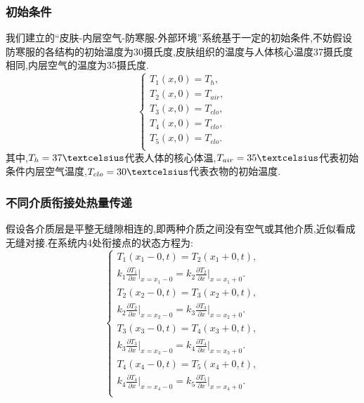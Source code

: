 \documentclass{whutmod}
\begin{document}
\subsubsection{初始条件}
我们建立的“皮肤-内层空气-防寒服-外部环境”系统基于一定的初始条件,不妨假设防寒服的各结构的初始温度为30摄氏度,皮肤组织的温度与人体核心温度37摄氏度相同,内层空气的温度为35摄氏度.
\begin{equation}
\begin{cases}
T_{1}(x,0)=T_{h},\\
T_{2}(x,0)=T_{air},\\
T_{3}(x,0)=T_{clo},\\
T_{4}(x,0)=T_{clo},\\
T_{5}(x,0)=T_{clo}.\\
\end{cases}
\end{equation}
其中,$T_{h}=37\textcelsius$代表人体的核心体温,$T_{air}=35\textcelsius$代表初始条件内层空气温度,$T_{clo}=30\textcelsius$代表衣物的初始温度.

\subsubsection{不同介质衔接处热量传递}
假设各介质层是平整无缝隙相连的,即两种介质之间没有空气或其他介质,近似看成无缝对接.在系统内4处衔接点的状态方程为:
\begin{equation}
\begin{cases} 
T_{1}(x_{1}-0,t)=T_{2}(x_{1}+0,t),\\
k_{1} \frac{\partial T_{1}}{\partial x}\big|_{x=x_{1}-0}=k_{2} \frac{\partial T_{2}}{\partial x}\big|_{x=x_{1}+0}.\\
T_{2}(x_{2}-0,t)=T_{3}(x_{2}+0,t),\\
k_{2} \frac{\partial T_{2}}{\partial x}\big|_{x=x_{2}-0}=k_{3} \frac{\partial T_{3}}{\partial x}\big|_{x=x_{2}+0}.\\
T_{3}(x_{3}-0,t)=T_{4}(x_{3}+0,t),\\
k_{3} \frac{\partial T_{3}}{\partial x}\big|_{x=x_{3}-0}=k_{4} \frac{\partial T_{4}}{\partial x}\big|_{x=x_{3}+0}.\\
T_{4}(x_{4}-0,t)=T_{5}(x_{4}+0,t),\\
k_{4} \frac{\partial T_{4}}{\partial x}\big|_{x=x_{4}-0}=k_{5} \frac{\partial T_{5}}{\partial x}\big|_{x=x_{4}+0}.\\
\end{cases}
\end{equation}
\end{document}
